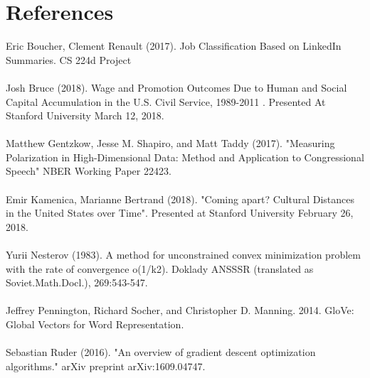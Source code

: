 \documentclass[11pt, oneside]{article}   	%
\begin{document}
\section{References}
Eric Boucher, Clement Renault (2017). Job Classification Based on LinkedIn Summaries. CS 224d Project
\\
\\
Josh Bruce (2018). Wage and Promotion Outcomes Due to Human and Social Capital Accumulation in the
U.S. Civil Service, 1989-2011 . Presented At Stanford University March 12, 2018.
\\
\\
Matthew Gentzkow, Jesse M. Shapiro, and Matt Taddy (2017). "Measuring Polarization in High-Dimensional Data: Method and Application to Congressional Speech" NBER Working Paper 22423. 
\\
\\
Emir Kamenica, Marianne Bertrand (2018). "Coming apart? Cultural Distances in the United States over Time". Presented at Stanford University February 26, 2018.
\\
\\
Yurii Nesterov (1983). A method for unconstrained convex minimization problem with the rate of
convergence o(1/k2). Doklady ANSSSR (translated as Soviet.Math.Docl.), 269:543-547.
\\\\
Jeffrey Pennington, Richard Socher, and Christopher D. Manning. 2014. GloVe: Global Vectors for Word Representation. 
\\
\\
Sebastian Ruder  (2016). "An overview of gradient descent optimization algorithms." arXiv preprint arXiv:1609.04747.
\end{document}
